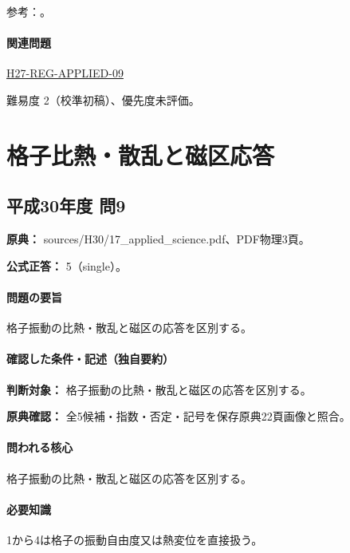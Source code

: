 \par 参考：\cite{openstax_crystals}。

\paragraph{関連問題} \hyperref[q:h27-reg-applied-09]{H27-REG-APPLIED-09}

\par 難易度 2（校準初稿）、優先度未評価。

\section{格子比熱・散乱と磁区応答}

\subsection{平成30年度 問9}
\label{q:h30-reg-applied-09}

\noindent\textbf{原典：} sources/H30/17\_applied\_science.pdf、PDF物理3頁。

\textbf{公式正答：} 5（single）。

\paragraph{問題の要旨} 格子振動の比熱・散乱と磁区の応答を区別する。

\paragraph{確認した条件・記述（独自要約）}\mbox{}\par

\noindent\textbf{判断対象：} 格子振動の比熱・散乱と磁区の応答を区別する。\par

\noindent\textbf{原典確認：} 全5候補・指数・否定・記号を保存原典22頁画像と照合。\par

\paragraph{問われる核心} 格子振動の比熱・散乱と磁区の応答を区別する。

\paragraph{必要知識} 1から4は格子の振動自由度又は熱変位を直接扱う。

